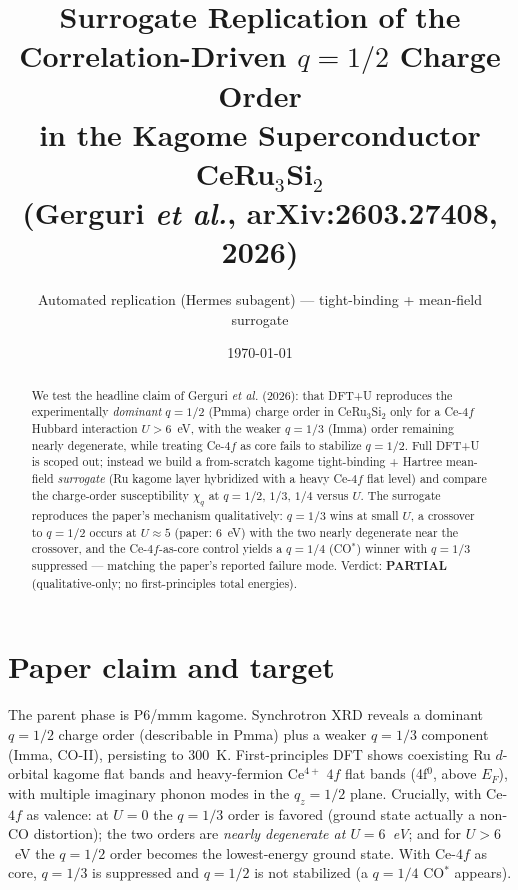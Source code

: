 \documentclass[11pt]{article}
\title{Surrogate Replication of the Correlation-Driven $q=1/2$ Charge Order\\
in the Kagome Superconductor CeRu$_3$Si$_2$\\
\large (Gerguri \textit{et al.}, arXiv:2603.27408, 2026)}
\author{Automated replication (Hermes subagent) --- tight-binding + mean-field surrogate}
\date{\today}
\begin{document}
\maketitle

\begin{abstract}
We test the headline claim of Gerguri \textit{et al.} (2026): that DFT+U reproduces
the experimentally \emph{dominant} $q=1/2$ (Pmma) charge order in CeRu$_3$Si$_2$
only for a Ce-$4f$ Hubbard interaction $U>6$~eV, with the weaker $q=1/3$ (Imma)
order remaining nearly degenerate, while treating Ce-$4f$ as core fails to
stabilize $q=1/2$. Full DFT+U is scoped out; instead we build a from-scratch
kagome tight-binding + Hartree mean-field \emph{surrogate} (Ru kagome layer
hybridized with a heavy Ce-$4f$ flat level) and compare the charge-order
susceptibility $\chi_q$ at $q=1/2,\,1/3,\,1/4$ versus $U$. The surrogate
reproduces the paper's mechanism qualitatively: $q=1/3$ wins at small $U$,
a crossover to $q=1/2$ occurs at $U\!\approx\!5$ (paper: $6$~eV) with the two
nearly degenerate near the crossover, and the Ce-$4f$-as-core control yields a
$q=1/4$ (CO$^*$) winner with $q=1/3$ suppressed --- matching the paper's reported
failure mode. Verdict: \textbf{PARTIAL} (qualitative-only; no first-principles
total energies).
\end{abstract}

\section{Paper claim and target}
The parent phase is P6/mmm kagome. Synchrotron XRD reveals a dominant $q=1/2$
charge order (describable in Pmma) plus a weaker $q=1/3$ component (Imma, CO-II),
persisting to 300~K. First-principles DFT shows coexisting Ru $d$-orbital kagome
flat bands and heavy-fermion Ce$^{4+}$ $4f$ flat bands (4f$^0$, above $E_F$), with
multiple imaginary phonon modes in the $q_z=1/2$ plane. Crucially, with Ce-$4f$ as
valence: at $U=0$ the $q=1/3$ order is favored (ground state actually a non-CO
distortion); the two orders are \emph{nearly degenerate at $U=6$~eV}; and for
$U>6$~eV the $q=1/2$ order becomes the lowest-energy ground state. With Ce-$4f$ as
core, $q=1/3$ is suppressed and $q=1/2$ is not stabilized (a $q=1/4$ CO$^*$
appears).
\end{document}

